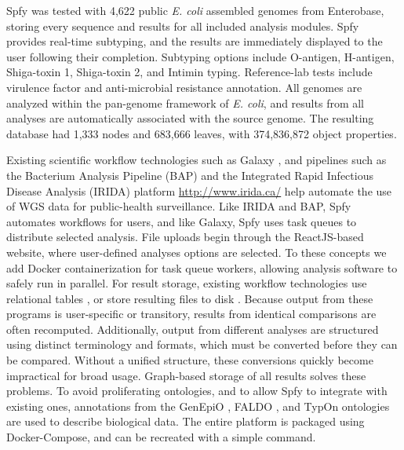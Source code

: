 \documentclass[a4paper, onecolumn]{NAR}
\begin{document}
Spfy was tested with 4,622 public \textit{E. coli} assembled genomes from Enterobase, storing every sequence and results for all included analysis modules.
Spfy provides real-time subtyping, and the results are immediately displayed to the user following their completion.
Subtyping options include O-antigen, H-antigen, Shiga-toxin 1, Shiga-toxin 2, and Intimin typing. Reference-lab tests include virulence factor and anti-microbial resistance annotation. All genomes are analyzed within the pan-genome framework of \textit{E. coli}, and results from all analyses are automatically associated with the source genome.
The resulting database had 1,333 nodes and 683,666 leaves, with 374,836,872 object properties. \par

Existing scientific workflow technologies such as Galaxy \cite{goecks2010galaxy}, and pipelines such as the Bacterium Analysis Pipeline (BAP) \cite{thomsen2016bacterial} and the Integrated Rapid Infectious Disease Analysis (IRIDA) platform \url{http://www.irida.ca/} help automate the use of WGS data for public-health surveillance.
Like IRIDA and BAP, Spfy automates workflows for users, and like Galaxy, Spfy uses task queues to distribute selected analysis. File uploads begin through the ReactJS-based website, where user-defined analyses options are selected. To these concepts we add Docker containerization for task queue workers, allowing analysis software to safely run in parallel.
For result storage, existing workflow technologies use relational tables \cite{goecks2010galaxy}, or store resulting files to disk \cite{thomsen2016bacterial}.
Because output from these programs is user-specific or transitory, results from identical comparisons are often recomputed. Additionally, output from different analyses are structured using distinct terminology and formats, which must be converted before they can be compared. Without a unified structure, these conversions quickly become impractical for broad usage. Graph-based storage of all results solves these problems.
To avoid proliferating ontologies, and to allow Spfy to integrate with existing ones, annotations from the GenEpiO \cite{griffiths2017context}, FALDO \cite{bolleman2016faldo}, and TypOn \cite{vaz2014typon} ontologies are used to describe biological data.
The entire platform is packaged using Docker-Compose, and can be recreated with a simple command. \par
\end{document}
